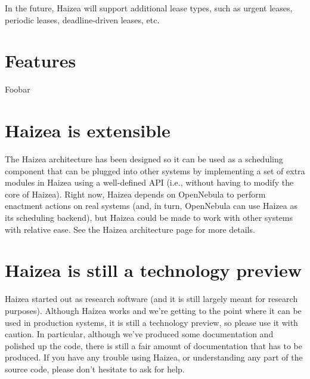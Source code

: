 In the future, Haizea will support additional lease types, such as urgent leases, periodic leases, deadline-driven leases, etc.

\section{Features}

Foobar

\section{Haizea is extensible}

The Haizea architecture has been designed so it can be used as a scheduling component that can be plugged into other systems by implementing a set of extra modules in Haizea using a well-defined API (i.e., without having to modify the core of Haizea). Right now, Haizea depends on OpenNebula to perform enactment actions on real systems (and, in turn, OpenNebula can use Haizea as its scheduling backend), but Haizea could be made to work with other systems with relative ease. See the Haizea architecture page for more details.

\section{Haizea is still a technology preview}

Haizea started out as research software (and it is still largely meant for research purposes). Although Haizea works and we're getting to the point where it can be used in production systems, it is still a technology preview, so please use it with caution. In particular, although we've produced some documentation and polished up the code, there is still a fair amount of documentation that has to be produced. If you have any trouble using Haizea, or understanding any part of the source code, please don't hesitate to ask for help.